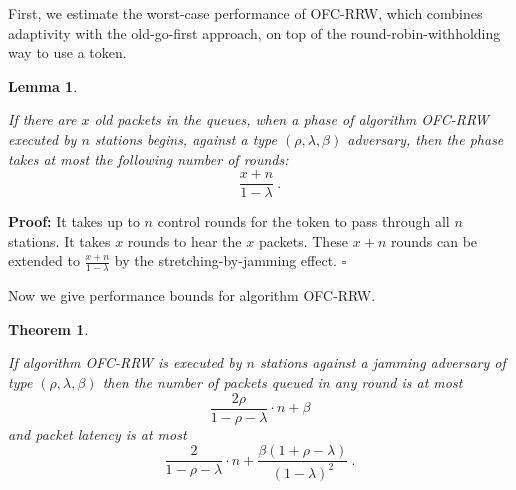 \documentclass[11pt]{article}
\newcommand{\qed}{\hfill $\square$}
\newtheorem{theorem}{Theorem}
\newtheorem{lemma}{Lemma}
\newenvironment{proof}{\noindent\textbf{Proof: }}{\qed \smallbreak}
\begin{document}
First, we estimate the worst-case performance of \textsc{OFC-RRW}, which combines adaptivity with the old-go-first approach, on top of the round-robin-withholding way to use a token.



\begin{lemma}
\label{lem:c-rrw-cycle-plus-packets}

If there are $x$ old packets in the queues, when a phase of algorithm \textsc{OFC-RRW} executed by $n$ stations begins, against a  type $(\rho,\lambda,\beta)$ adversary, then the phase takes at most the following number of rounds:
\[
\frac{x + n }{1-\lambda}
\ .
\] 

\end{lemma}


\begin{proof}
It takes up to $n$ control rounds for the token to pass through all $n$ stations.
It takes $x$ rounds to hear the $x$ packets.
These $x+n$ rounds can be extended to $\frac{x+n}{1-\lambda} $ by the stretching-by-jamming effect.
\end{proof}

Now we give performance bounds for algorithm \textsc{OFC-RRW}.




\begin{theorem}
\label{thm:OFC-RRW-jamming}

If algorithm \textsc{OFC-RRW} is executed by $n$ stations against a jamming adversary of type $(\rho,\lambda,\beta)$ then the number of packets queued in any round is at most
\begin{equation}
\label{eqn:OFC-RRW-jamming-queues}
\frac{2\rho}{1-\rho-\lambda} \cdot n +\beta
\end{equation}
and packet latency  is  at most 
\begin{equation}
\label{eqn:OFC-RRW-jamming-latency}
\frac{2}{1-\rho-\lambda} \cdot n + \frac{\beta(1+\rho-\lambda) }{(1-\lambda)^2}
\ .
\end{equation}
\end{theorem}
\end{document}
